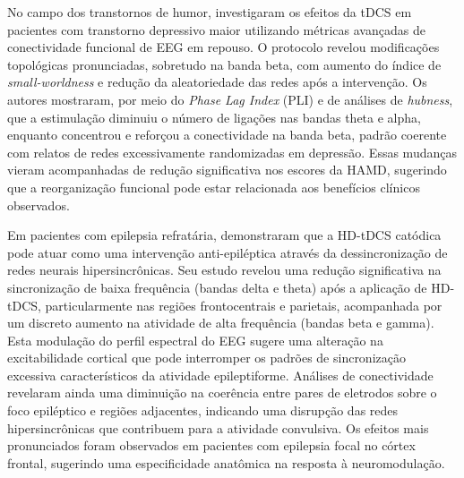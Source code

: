 No campo dos transtornos de humor,  investigaram os efeitos da tDCS em pacientes com transtorno depressivo maior utilizando métricas avançadas de conectividade funcional de EEG em repouso. O protocolo revelou modificações topológicas pronunciadas, sobretudo na banda beta, com aumento do índice de \textit{small-worldness} e redução da aleatoriedade das redes após a intervenção. Os autores mostraram, por meio do \textit{Phase Lag Index} (PLI) e de análises de \textit{hubness}, que a estimulação diminuiu o número de ligações nas bandas theta e alpha, enquanto concentrou e reforçou a conectividade na banda beta, padrão coerente com relatos de redes excessivamente randomizadas em depressão. Essas mudanças vieram acompanhadas de redução significativa nos escores da HAMD, sugerindo que a reorganização funcional pode estar relacionada aos benefícios clínicos observados.

Em pacientes com epilepsia refratária,  demonstraram que a HD-tDCS catódica pode atuar como uma intervenção anti-epiléptica através da dessincronização de redes neurais hipersincrônicas. Seu estudo revelou uma redução significativa na sincronização de baixa frequência (bandas delta e theta) após a aplicação de HD-tDCS, particularmente nas regiões frontocentrais e parietais, acompanhada por um discreto aumento na atividade de alta frequência (bandas beta e gamma). Esta modulação do perfil espectral do EEG sugere uma alteração na excitabilidade cortical que pode interromper os padrões de sincronização excessiva característicos da atividade epileptiforme. Análises de conectividade revelaram ainda uma diminuição na coerência entre pares de eletrodos sobre o foco epiléptico e regiões adjacentes, indicando uma disrupção das redes hipersincrônicas que contribuem para a atividade convulsiva. Os efeitos mais pronunciados foram observados em pacientes com epilepsia focal no córtex frontal, sugerindo uma especificidade anatômica na resposta à neuromodulação.

